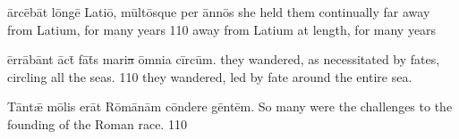\documentclass[]{article}
\begin{document}
\newpage

\latline
{\=arc\={\macron e}b\=at l\=ong\={\macron e} L\-at\-i\={\macron o}, m\=ult\={\macron o}squ\-e p\-er \=ann\={\macron o}s}
{she held them continually far away from Latium, for many years }
{110}
{away from Latium at length, for many years}
{}

\latline
{\=err\={\macron a}b\=ant \={\macron a}ct\={\macron{\i}} f\={\macron a}t\={\macron{\i}}s m\-ar\-i\sout{a }\=omn\-i\-a c\=irc\=um.}
{they wandered, as necessitated by fates, circling all the seas.}
{110}
{they wandered, led by fate around the entire sea.}
{}

\latline
{T\=ant\={\ae} m\={\macron o}l\-is \-er\=at R\={\macron o}m\={\macron a}n\=am c\=ond\-er\-e g\=ent\=em.}
{So many were the challenges to the founding of the Roman race.}
{110}
{}
{}
\end{document}
